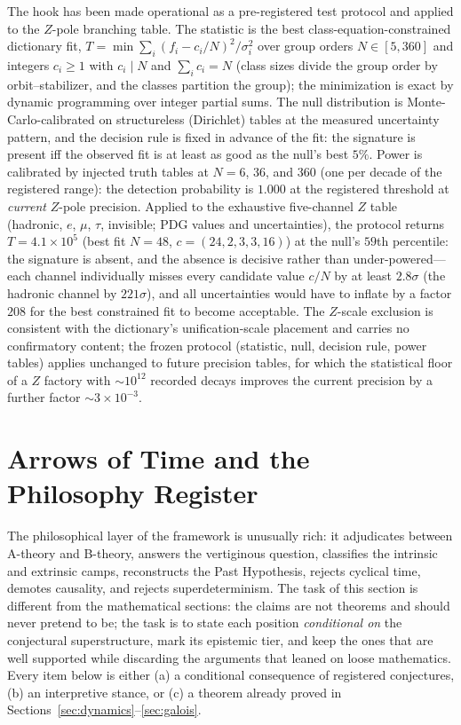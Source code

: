 \documentclass[11pt,a4paper]{article}
\theoremstyle{plain}
\theoremstyle{definition}
\theoremstyle{remark}
\begin{document}
The hook has been made operational as a pre-registered test protocol and applied to the
$Z$-pole branching table. The statistic is the best class-equation-constrained dictionary
fit,
$T=\min\sum_{i}(f_{i}-c_{i}/N)^{2}/\sigma_{i}^{2}$ over group orders $N\in[5,360]$ and
integers $c_{i}\geq1$ with $c_{i}\mid N$ and $\sum_{i}c_{i}=N$ (class sizes divide the
group order by orbit--stabilizer, and the classes partition the group); the minimization is
exact by dynamic programming over integer partial sums. The null distribution is
Monte-Carlo-calibrated on structureless (Dirichlet) tables at the measured uncertainty
pattern, and the decision rule is fixed in advance of the fit: the signature is present iff
the observed fit is at least as good as the null's best $5\%$. Power is calibrated by
injected truth tables at $N=6$, $36$, and $360$ (one per decade of the registered range):
the detection probability is $1.000$ at the registered threshold at \emph{current}
$Z$-pole precision. Applied to the exhaustive five-channel $Z$ table
(hadronic, $e$, $\mu$, $\tau$, invisible; PDG values and uncertainties), the protocol
returns $T=4.1\times10^{5}$ (best fit $N=48$, $c=(24,2,3,3,16)$) at the null's $59$th
percentile: the signature is absent, and the absence is decisive rather than
under-powered---each channel individually misses every candidate value $c/N$ by at least
$2.8\sigma$ (the hadronic channel by $221\sigma$), and all uncertainties would have to
inflate by a factor $208$ for the best constrained fit to become acceptable. The $Z$-scale
exclusion is consistent with the dictionary's unification-scale placement and carries no
confirmatory content; the frozen protocol (statistic, null, decision rule, power tables)
applies unchanged to future precision tables, for which the statistical floor of a
$Z$ factory with $\sim10^{12}$ recorded decays improves the current precision by a further
factor $\sim3\times10^{-3}$.

\section{Arrows of Time and the Philosophy Register}\label{sec:philosophy}

The philosophical layer of the framework is unusually rich: it adjudicates between A-theory and
B-theory, answers the vertiginous question, classifies the intrinsic and extrinsic camps,
reconstructs the Past Hypothesis, rejects cyclical time, demotes causality, and rejects
superdeterminism. The task of this section is different from the mathematical
sections: the claims are not theorems and should never pretend to be; the task is to state
each position \emph{conditional on} the conjectural superstructure, mark its epistemic tier,
and keep the ones that are well supported while discarding the arguments that leaned on
loose mathematics. Every item below is either (a) a conditional consequence of
registered conjectures, (b) an interpretive stance, or (c) a theorem already
proved in Sections~\ref{sec:dynamics}--\ref{sec:galois}.
\end{document}
